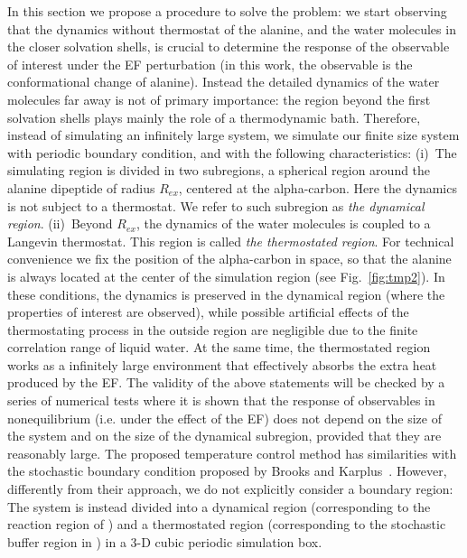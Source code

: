 \documentclass[a4paper,preprint,unsortedaddress,onecolumn]{revtex4-1}
\newcommand{\recheck}[1]{{\color{red} #1}}
\begin{document}
In this section we propose a procedure to solve the problem: we
start observing that the dynamics without thermostat of the alanine, 
and the water molecules in the closer solvation shells, is
crucial to determine the response of the observable of interest
under the EF perturbation
(in this work, the observable is the conformational change of alanine).
Instead the detailed dynamics of
the water molecules far away is not of primary importance: the region beyond the first solvation shells plays mainly the role of a thermodynamic bath. 
Therefore, instead of simulating an infinitely
large system, we simulate our finite size system with periodic
boundary condition, and with the following characteristics:
(i)~The simulating region is divided in two
subregions, a spherical region around the alanine dipeptide of radius $R_{ex}$,
centered at the alpha-carbon. Here the dynamics is
not subject to a thermostat.
We refer to such subregion as \emph{the  dynamical
region}. (ii)~Beyond $R_{ex}$, the dynamics of the water molecules is coupled
to a Langevin thermostat.  This region is called \emph{the thermostated
region}. For technical convenience we
fix the position of the alpha-carbon in space, so that the alanine is always
located at the center of the simulation region (see Fig.~\ref{fig:tmp2}).
In these conditions, the  dynamics is preserved in the dynamical region (where the properties of interest are observed), while 
possible artificial effects of the thermostating process in the outside region
are negligible due to the finite correlation
range of liquid water.
At the same time, the thermostated region works as a infinitely large
environment that effectively absorbs the extra heat produced by the EF.
The validity of the above
statements will be checked by a series of numerical tests where it is shown that
the response of observables in nonequilibrium (i.e. under the effect of the EF) does not depend on the size of the system
and on the size of the  dynamical subregion, provided that they are
reasonably large.
\recheck{ The proposed temperature control method has similarities with 
  the stochastic boundary condition proposed by Brooks and Karplus~\cite{brooks1983deformable}.
  However, differently from their approach, we do not explicitly consider a boundary region: The system is instead divided into a dynamical region (corresponding to the reaction region of \cite{brooks1983deformable}) and
  a thermostated region (corresponding to the stochastic buffer region in \cite{brooks1983deformable}) in a 3-D cubic periodic simulation box.
} 
\end{document}
